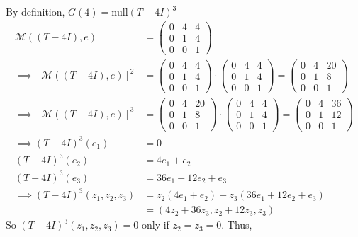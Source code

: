 \documentclass[12pt]{article}
\begin{document}
\begin{enumerate}[\ \ \it(a)\ \ ]
	\noindent By definition, $G(4) = \text{null}(T - 4I)^3$
	\begin{align*}
		\mathcal{M}((T - 4I), e) &= \left(\begin{array}{ccc}
			0 & 4 & 4 \\
			0 & 1 & 4 \\
			0 & 0 & 1
		\end{array}\right) \\
		\implies [\mathcal{M}((T - 4I), e)]^2 &= \left(\begin{array}{ccc}
			0 & 4 & 4 \\
			0 & 1 & 4 \\
			0 & 0 & 1
		\end{array}\right) \cdot \left(\begin{array}{ccc}
			0 & 4 & 4 \\
			0 & 1 & 4 \\
			0 & 0 & 1
		\end{array}\right) = \left(\begin{array}{ccc}
			0 & 4 & 20 \\
			0 & 1 & 8 \\
			0 & 0 & 1
		\end{array}\right) \\
		\implies [\mathcal{M}((T - 4I), e)]^3 &= \left(\begin{array}{ccc}
			0 & 4 & 20 \\
			0 & 1 & 8 \\
			0 & 0 & 1
		\end{array}\right) \cdot \left(\begin{array}{ccc}
			0 & 4 & 4 \\
			0 & 1 & 4 \\
			0 & 0 & 1
		\end{array}\right) = \left(\begin{array}{ccc}
			0 & 4 & 36 \\
			0 & 1 & 12 \\
			0 & 0 & 1
		\end{array}\right) \\
		\implies (T - 4I)^3(e_1) &= 0 \\
		(T - 4I)^3(e_2) &= 4e_1 + e_2 \\
		(T - 4I)^3(e_3) &= 36e_1 + 12e_2 + e_3 \\
		\implies (T - 4I)^3(z_1, z_2, z_3) &= z_2(4e_1 + e_2) + z_3(36e_1 + 12e_2 + e_3) \\
		&= (4z_2 + 36z_3, z_2 + 12z_3, z_3)
	\end{align*}
	So $(T - 4I)^3(z_1, z_2, z_3) = 0$ only if $z_2 = z_3 = 0$.  Thus,

\end{enumerate}
\end{document}
